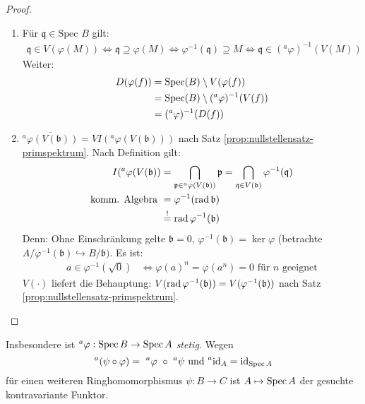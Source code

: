 \begin{proof} \mbox{}
  \begin{enumerate}
  \item Für $\mathfrak{q}\in\text{Spec }B$ gilt:
    \begin{align}
       \mathfrak{q}\in V(\varphi(M)) \iff \mathfrak{q}\supseteq\varphi(M)
      \iff \varphi^{-1}(\mathfrak{q})\supseteq M \iff \mathfrak{q}\in(^a\varphi)^{-1}(V(M))
    \end{align}
    Weiter:
    \begin{align}
      D(\varphi(f)) & =\operatorname{Spec}(B)\setminus V(\varphi(f)) \\
                    & =\operatorname{Spec}(B)\setminus (^a\varphi)^{-1} (V(f)) \\
                    & = (^a\varphi)^{-1} (D(f))
    \end{align}
     
  \item
    $\overline{^{a}\varphi(V(\mathfrak{b}))}=VI(^{a}\varphi(V(\mathfrak{b})))$
    nach Satz \ref{prop:nullstellensatz-primspektrum}. Nach Definition gilt:
    \begin{align*} I(^{a}\varphi(V(\mathfrak{b}))
      & =\bigcap_{\mathfrak{p}\in^{a}\varphi(V(\mathfrak{b}))}
        \mathfrak{p}=\bigcap_{\mathfrak{q}\in V(\mathfrak{b})}
        \varphi^{-1}(\mathfrak{q})\\ \text{komm. Algebra }
      & =\varphi^{-1}(\operatorname{rad}\mathfrak{b})\\
      & \overset{!}{=}\operatorname{rad}\varphi^{-1}(\mathfrak{b})
    \end{align*}
    Denn: Ohne Einschränkung gelte $\mathfrak{b}=0$,
    $\varphi^{-1}(\mathfrak{b})=\ker\varphi$
    (betrachte $A/\varphi^{-1}(\mathfrak{b})\hookrightarrow B/\mathfrak{b})$. Es
    ist:
    \begin{align*}
      a\in\varphi^{-1}(\sqrt{0})
      & \Leftrightarrow\varphi(a)^{n}=\varphi(a^{n})=0
        \text{ für }n\text{ geeignet}
    \end{align*} $V(\cdot )$
    liefert die Behauptung: $V(\operatorname{rad}\varphi^{-1}
    (\mathfrak{b}))=V(\varphi^{-1}(\mathfrak{b}))$ nach Satz \ref{prop:nullstellensatz-primspektrum}.
  \end{enumerate}
\end{proof}
Insbesondere ist $^{a}\varphi:\operatorname{Spec} B\rightarrow\operatorname{Spec} A$
\emph{stetig}.  Wegen
\[
  ^{a}(\psi\circ\varphi)=\ ^{a}\varphi\ \circ\ ^{a}\psi \text{ und } ^{a}\mathrm{id}_{A} = \mathrm{id}_{\Spec A}
\]
für einen weiteren Ringhomomorphismus $\psi:B\rightarrow C$ ist
$A\mapsto\operatorname{Spec} A$ der gesuchte kontravariante Funktor.


